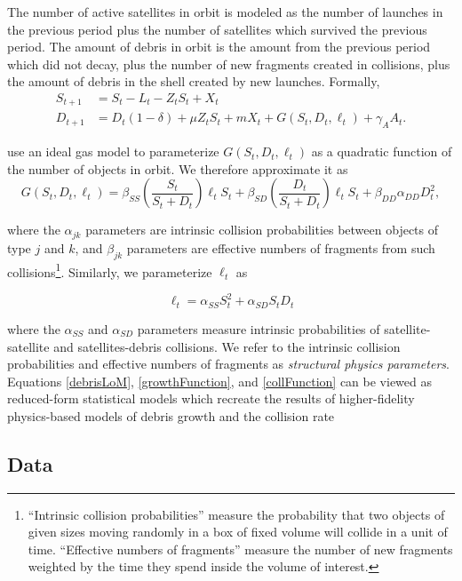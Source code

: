 \documentclass[12pt]{article}
\begin{document}
The number of active satellites in orbit is modeled as the number of launches in the previous period plus the number of satellites which survived the previous period. The amount of debris in orbit is the amount from the previous period which did not decay, plus the number of new fragments created in collisions, plus the amount of debris in the shell created by new launches. Formally,
\begin{align}
\label{satelliteLoM}
S_{t+1} &= S_t -L_t -Z_tS_t + X_t \\
\label{debrisLoM}
D_{t+1} &= D_t(1-\delta) + \mu Z_tS_t + mX_t + G(S_t,D_t,\ell_t) + \gamma_A A_t.
\end{align}

\cite{bradleywein2009} use an ideal gas model to parameterize $G(S_t,D_t,\ell_t)$ as a quadratic function of the number of objects in orbit. We therefore approximate it as
\begin{equation}
\label{growthFunction}
G(S_t,D_t,\ell_t) = \beta_{SS} \left( \frac{S_t}{S_t+D_t} \right ) \ell_t S_t + \beta_{SD}\left( \frac{D_t}{S_t+D_t} \right ) \ell_t S_t +  \beta_{DD} \alpha_{DD} D_t^2,
\end{equation}

where the $\alpha_{jk}$ parameters are intrinsic collision probabilities between objects of type $j$ and $k$, and $\beta_{jk}$ parameters are effective numbers of fragments from such collisions\footnote{``Intrinsic collision probabilities'' measure the probability that two objects of given sizes moving randomly in a box of fixed volume will collide in a unit of time. ``Effective numbers of fragments'' measure the number of new fragments weighted by the time they spend inside the volume of interest.}. Similarly, we parameterize $\ell_t$ as

\begin{equation}
\label{collFunction}
\ell_t = \alpha_{SS} S_t^2 + \alpha_{SD} S_t D_t
\end{equation}

where the $\alpha_{SS}$ and $\alpha_{SD}$ parameters measure intrinsic probabilities of satellite-satellite and satellites-debris collisions. We refer to the intrinsic collision probabilities and effective numbers of fragments as \textit{structural physics parameters}. Equations \ref{debrisLoM}, \ref{growthFunction}, and \ref{collFunction} can be viewed as reduced-form statistical models which recreate the results of higher-fidelity physics-based models of debris growth and the collision rate

\subsection{Data}
\end{document}
